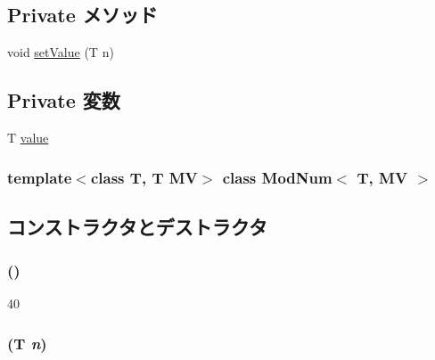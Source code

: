\subsection*{Private メソッド}
\begin{DoxyCompactItemize}
\item 
void \hyperlink{classModNum_aa364efa60a7b2776a6742997dbd0834b}{setValue} (T n)
\end{DoxyCompactItemize}
\subsection*{Private 変数}
\begin{DoxyCompactItemize}
\item 
T \hyperlink{classModNum_a4fc7f59e3113e19697159919a5aad095}{value}
\end{DoxyCompactItemize}
\subsubsection*{template$<$class T, T MV$>$ class ModNum$<$ T, MV $>$}



\subsection{コンストラクタとデストラクタ}
\hypertarget{classModNum_a47ef790027a42be8a3b6ab6279c3f0cd}{
\subsubsection[{ModNum}]{ ()}}
\label{classModNum_a47ef790027a42be8a3b6ab6279c3f0cd}



\begin{DoxyCode}
40 {}
\end{DoxyCode}
\hypertarget{classModNum_a3d3f4e8f4467b44da989f147858e4539}{
\subsubsection[{ModNum}]{ (T {\em n})}}
\label{classModNum_a3d3f4e8f4467b44da989f147858e4539}



